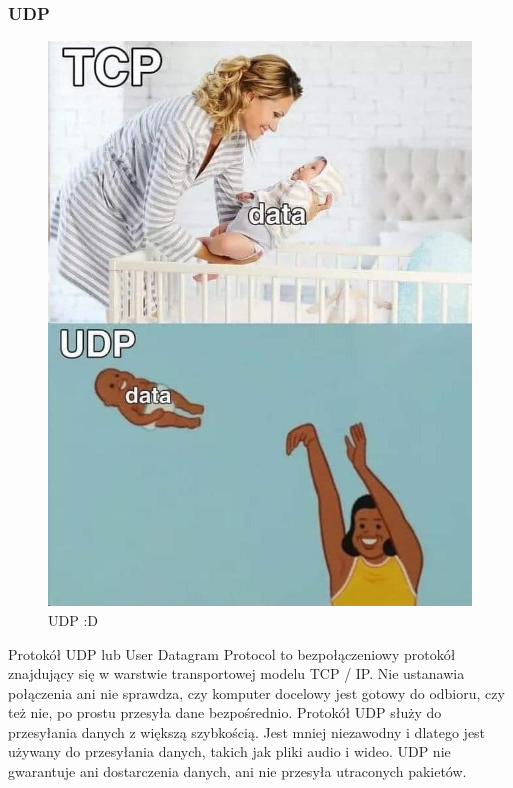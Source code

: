 \documentclass[a4paper,12pt,oneside]{book}
\begin{document}
				\subsubsection*{UDP}
				
				\begin{figure}[h!]
					\centering\includegraphics[scale=0.25]{udp.jpg}
					\caption{UDP :D}
				\end{figure}
				
				Protokół UDP lub User Datagram Protocol to bezpołączeniowy protokół znajdujący się w warstwie transportowej modelu TCP / IP. Nie ustanawia połączenia ani nie sprawdza, czy komputer docelowy jest gotowy do odbioru, czy też nie, po prostu przesyła dane bezpośrednio. Protokół UDP służy do przesyłania danych z większą szybkością. Jest mniej niezawodny i dlatego jest używany do przesyłania danych, takich jak pliki audio i wideo.
				UDP nie gwarantuje ani dostarczenia danych, ani nie przesyła utraconych pakietów.	
				
\end{document}
